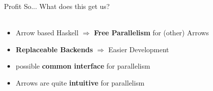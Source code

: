 \begin{frame}[fragile]{Profit}
So... What does this get us?\\~\\
\begin{itemize}
	\item Arrow based Haskell $\Rightarrow$ \textbf{Free Parallelism} for (other) Arrows
	\item \textbf{Replaceable Backends} $\Rightarrow$ Easier Development
	\item possible \textbf{common interface} for parallelism
	\item Arrows are quite \textbf{intuitive} for parallelism
\end{itemize}
\vfill	
\end{frame}